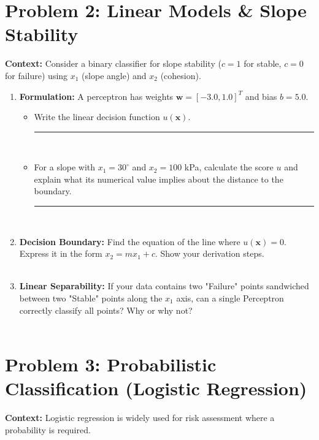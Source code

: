 \documentclass[12pt]{article}
\begin{document}
\section{Problem 2: Linear Models \& Slope Stability}
\textbf{Context:} Consider a binary classifier for slope stability ($c=1$ for stable, $c=0$ for failure) using $x_1$ (slope angle) and $x_2$ (cohesion).

\begin{enumerate}[label=(\alph*)]
    \item \textbf{Formulation:} A perceptron has weights $\bm{w} = [-3.0, 1.0]^T$ and bias $b = 5.0$. 
    \begin{itemize}
        \item Write the linear decision function $u(\bm{x})$. \rule{2.5in}{0.15mm} \\
        \fullunderline
        \item For a slope with $x_1 = 30^\circ$ and $x_2 = 100$ kPa, calculate the score $u$ and explain what its numerical value implies about the distance to the boundary. \rule{1in}{0.15mm} \\
        \fullunderline
    \end{itemize}

    \item \textbf{Decision Boundary:} Find the equation of the line where $u(\bm{x}) = 0$. Express it in the form $x_2 = m x_1 + c$. Show your derivation steps. \\
    \fullunderline \\
    \fullunderline

    \item \textbf{Linear Separability:} If your data contains two "Failure" points sandwiched between two "Stable" points along the $x_1$ axis, can a single Perceptron correctly classify all points? Why or why not? \\
    \fullunderline \\
    \fullunderline
\end{enumerate}

\section{Problem 3: Probabilistic Classification (Logistic Regression)}
\textbf{Context:} Logistic regression is widely used for risk assessment where a probability is required.
\end{document}
